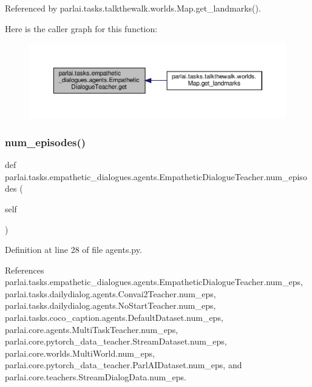 Referenced by parlai.\+tasks.\+talkthewalk.\+worlds.\+Map.\+get\+\_\+landmarks().

Here is the caller graph for this function\+:
\nopagebreak
\begin{figure}[H]
\begin{center}
\leavevmode
\includegraphics[width=350pt]{classparlai_1_1tasks_1_1empathetic__dialogues_1_1agents_1_1EmpatheticDialogueTeacher_aabbb16fc89a8537631c13b3569efd223_icgraph}
\end{center}
\end{figure}
\mbox{\label{classparlai_1_1tasks_1_1empathetic__dialogues_1_1agents_1_1EmpatheticDialogueTeacher_a6859c7bc8c2c58f1c2ac23d7eb804eb7}} 
\subsubsection{\texorpdfstring{num\+\_\+episodes()}{num\_episodes()}}
{\footnotesize\ttfamily def parlai.\+tasks.\+empathetic\+\_\+dialogues.\+agents.\+Empathetic\+Dialogue\+Teacher.\+num\+\_\+episodes (\begin{DoxyParamCaption}\item[{}]{self }\end{DoxyParamCaption})}



Definition at line 28 of file agents.\+py.



References parlai.\+tasks.\+empathetic\+\_\+dialogues.\+agents.\+Empathetic\+Dialogue\+Teacher.\+num\+\_\+eps, parlai.\+tasks.\+dailydialog.\+agents.\+Convai2\+Teacher.\+num\+\_\+eps, parlai.\+tasks.\+dailydialog.\+agents.\+No\+Start\+Teacher.\+num\+\_\+eps, parlai.\+tasks.\+coco\+\_\+caption.\+agents.\+Default\+Dataset.\+num\+\_\+eps, parlai.\+core.\+agents.\+Multi\+Task\+Teacher.\+num\+\_\+eps, parlai.\+core.\+pytorch\+\_\+data\+\_\+teacher.\+Stream\+Dataset.\+num\+\_\+eps, parlai.\+core.\+worlds.\+Multi\+World.\+num\+\_\+eps, parlai.\+core.\+pytorch\+\_\+data\+\_\+teacher.\+Parl\+A\+I\+Dataset.\+num\+\_\+eps, and parlai.\+core.\+teachers.\+Stream\+Dialog\+Data.\+num\+\_\+eps.



